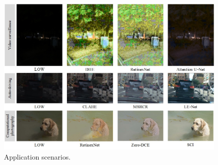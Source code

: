 \documentclass[CJK,aspectratio=169]{beamer}  %
\begin{document}
\begin{frame}
\begin{figure}
\begin{minipage}{.4\columnwidth}
\begin{itemize}
				\end{itemize}
			\end{minipage}
			\begin{minipage}{.55\columnwidth}
				\setlength{\abovecaptionskip}{-0.05cm}
				\centering
				\includegraphics[width=\linewidth]{picture/LLIE/application scenarios}
				\caption{
					\label{fig: application scenarios}
					\tiny Application scenarios.
				}
			\end{minipage}
		\end{figure}
	\end{frame}
	
\end{document}
